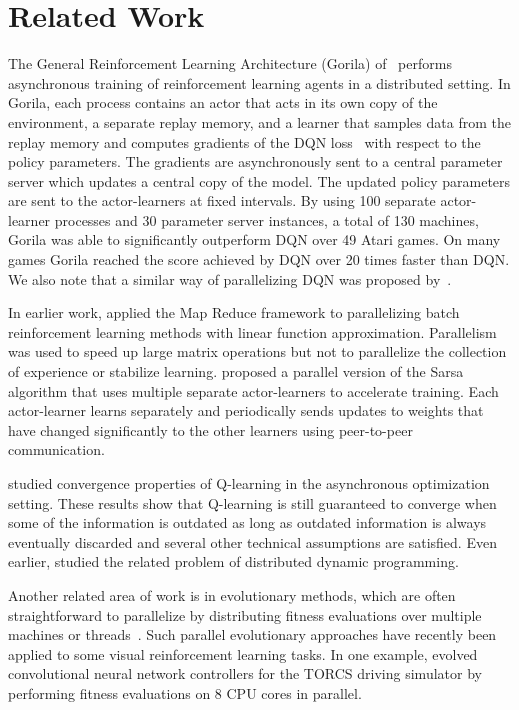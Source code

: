 \documentclass{article} %
\begin{document}
%
\vspace{-0.1cm}
\section{Related Work}
\label{sec:related}

The General Reinforcement Learning Architecture (Gorila) of~\cite{nair2015gorila} performs asynchronous training of reinforcement learning agents in a distributed setting.
In Gorila, each process contains an actor that acts in its own copy of the environment, a separate replay memory, and a learner that samples data from the replay memory and computes gradients of the DQN loss~\citep{mnih-dqn-2015} with respect to the policy parameters.
The gradients are asynchronously sent to a central parameter server which updates a central copy of the model.
The updated policy parameters are sent to the actor-learners at fixed intervals.
By using 100 separate actor-learner processes and 30 parameter server instances, a total of 130 machines, Gorila was able to significantly outperform DQN over 49 Atari games.
On many games Gorila reached the score achieved by DQN over 20 times faster than DQN.
We also note that a similar way of parallelizing DQN was proposed by~\cite{chavez2015deepq}.

In earlier work, \cite{li:mapreduce} applied the Map Reduce framework to parallelizing batch reinforcement learning methods with linear function approximation.
Parallelism was used to speed up large matrix operations but not to parallelize the collection of experience or stabilize learning.
\cite{grounds:parallelRL} proposed a parallel version of the Sarsa algorithm that uses multiple separate actor-learners to accelerate training.
Each actor-learner learns separately and periodically sends updates to weights that have changed significantly to the other learners using peer-to-peer communication.

\cite{tsitsiklis1994asynchronous} studied convergence properties of Q-learning in the asynchronous optimization setting.
These results show that Q-learning is still guaranteed to converge when some of the information is outdated as long as outdated information is always eventually discarded and several other technical assumptions are satisfied.
Even earlier, \cite{bertsekas1982distributed} studied the related problem of distributed dynamic programming.

Another related area of work is in evolutionary methods, which are often straightforward to parallelize by distributing fitness evaluations over multiple machines or threads~\citep{tomassini1999parallel}.
Such parallel evolutionary approaches have recently been applied to some visual reinforcement learning tasks.
In one example, \cite{koutnik2014} evolved convolutional neural network controllers for the TORCS driving simulator by performing fitness evaluations on 8 CPU cores in parallel.
\end{document}
